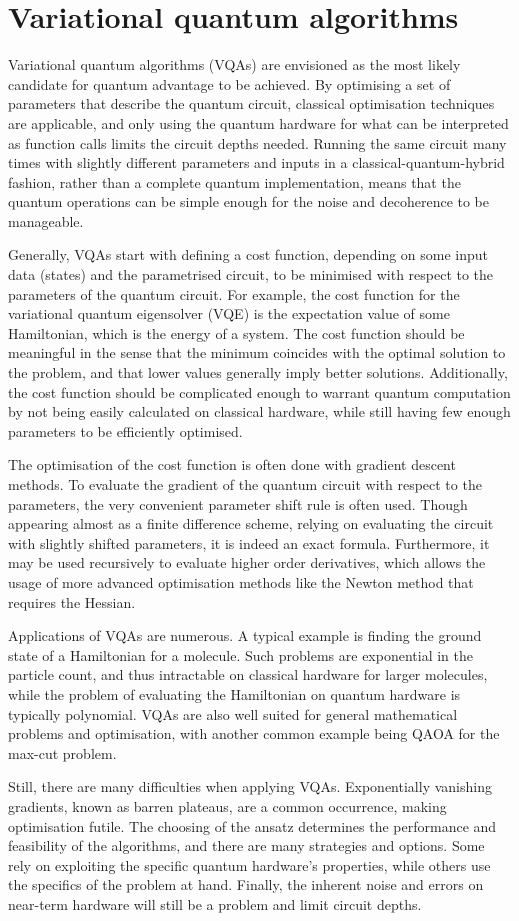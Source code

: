 \section{Variational quantum algorithms}
\label{sec:vqa}
Variational quantum algorithms (VQAs) are envisioned as the most likely candidate for quantum advantage to be achieved.
By optimising a set of parameters that describe the quantum circuit, classical optimisation techniques are applicable, and only using the quantum hardware for what can be interpreted as function calls limits the circuit depths needed.
Running the same circuit many times with slightly different parameters and inputs in a classical-quantum-hybrid fashion, rather than a complete quantum implementation, means that the quantum operations can be simple enough for the noise and decoherence to be manageable.

Generally, VQAs start with defining a cost function, depending on some input data (states) and the parametrised circuit, to be minimised with respect to the parameters of the quantum circuit.
For example, the cost function for the variational quantum eigensolver (VQE) is the expectation value of some Hamiltonian, which is the energy of a system.
The cost function should be meaningful in the sense that the minimum coincides with the optimal solution to the problem, and that lower values generally imply better solutions.
Additionally, the cost function should be complicated enough to warrant quantum computation by not being easily calculated on classical hardware, while still having few enough parameters to be efficiently optimised.

The optimisation of the cost function is often done with gradient descent methods.
To evaluate the gradient of the quantum circuit with respect to the parameters, the very convenient parameter shift rule is often used.
Though appearing almost as a finite difference scheme, relying on evaluating the circuit with slightly shifted parameters, it is indeed an exact formula.
Furthermore, it may be used recursively to evaluate higher order derivatives, which allows the usage of more advanced optimisation methods like the Newton method that requires the Hessian.

Applications of VQAs are numerous.
A typical example is finding the ground state of a Hamiltonian for a molecule.
Such problems are exponential in the particle count, and thus intractable on classical hardware for larger molecules, while the problem of evaluating the Hamiltonian on quantum hardware is typically polynomial.
VQAs are also well suited for general mathematical problems and optimisation, with another common example being QAOA for the max-cut problem.

Still, there are many difficulties when applying VQAs.
Exponentially vanishing gradients, known as barren plateaus, are a common occurrence, making optimisation futile.
The choosing of the ansatz determines the performance and feasibility of the algorithms, and there are many strategies and options.
Some rely on exploiting the specific quantum hardware's properties, while others use the specifics of the problem at hand.
Finally, the inherent noise and errors on near-term hardware will still be a problem and limit circuit depths.